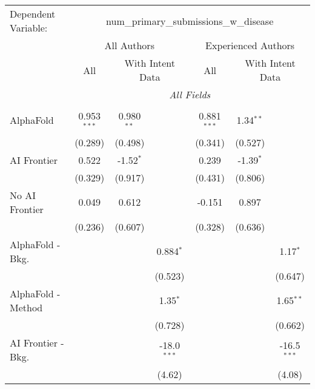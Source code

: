 \begingroup
\centering
\begin{tabular}{lcccccc}
   \tabularnewline \midrule \midrule
   Dependent Variable: & \multicolumn{6}{c}{num\_primary\_submissions\_w\_disease}\\
 & \multicolumn{3}{c}{All Authors} & \multicolumn{3}{c}{Experienced Authors} \\
\cmidrule(lr){2-4} \cmidrule(lr){5-7}
 & \multicolumn{1}{c}{All} & \multicolumn{2}{c}{With Intent Data} & \multicolumn{1}{c}{All} & \multicolumn{2}{c}{With Intent Data} \\
\cmidrule(lr){2-2} \cmidrule(lr){3-4} \cmidrule(lr){5-5} \cmidrule(lr){6-7}
 & \multicolumn{6}{c}{\textit{All Fields}} \\ \\
   AlphaFold               & 0.953$^{***}$ & 0.980$^{**}$ &               & 0.881$^{***}$ & 1.34$^{**}$ &   \\   
                           & (0.289)       & (0.498)      &               & (0.341)       & (0.527)     &   \\   
   AI Frontier             & 0.522         & -1.52$^{*}$  &               & 0.239         & -1.39$^{*}$ &   \\   
                           & (0.329)       & (0.917)      &               & (0.431)       & (0.806)     &   \\   
   No AI Frontier          & 0.049         & 0.612        &               & -0.151        & 0.897       &   \\   
                           & (0.236)       & (0.607)      &               & (0.328)       & (0.636)     &   \\   
   AlphaFold - Bkg.        &               &              & 0.884$^{*}$   &               &             & 1.17$^{*}$\\   
                           &               &              & (0.523)       &               &             & (0.647)\\   
   AlphaFold - Method      &               &              & 1.35$^{*}$    &               &             & 1.65$^{**}$\\   
                           &               &              & (0.728)       &               &             & (0.662)\\   
   AI Frontier - Bkg.      &               &              & -18.0$^{***}$ &               &             & -16.5$^{***}$\\   
                           &               &              & (4.62)        &               &             & (4.08)\\   

\end{tabular}

